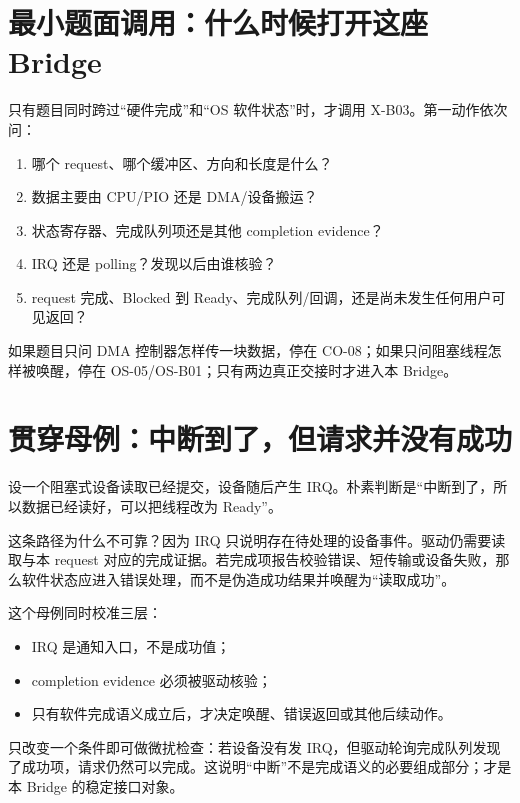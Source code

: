 \documentclass[UTF8,fontset=none,11pt,a4paper]{ctexart}
\begin{document}
\section{最小题面调用：什么时候打开这座 Bridge}

只有题目同时跨过“硬件完成”和“OS 软件状态”时，才调用 X-B03。第一动作依次问：

\begin{enumerate}
  \item {} 哪个 request、哪个缓冲区、方向和长度是什么？
  \item {} 数据主要由 CPU/PIO 还是 DMA/设备搬运？
  \item {} 状态寄存器、完成队列项还是其他 completion evidence？
  \item {} IRQ 还是 polling？发现以后由谁核验？
  \item {} request 完成、Blocked 到 Ready、完成队列/回调，还是尚未发生任何用户可见返回？
\end{enumerate}

如果题目只问 DMA 控制器怎样传一块数据，停在 CO-08；如果只问阻塞线程怎样被唤醒，停在 OS-05/OS-B01；只有两边真正交接时才进入本 Bridge。

\section{贯穿母例：中断到了，但请求并没有成功}

设一个阻塞式设备读取已经提交，设备随后产生 IRQ。朴素判断是“中断到了，所以数据已经读好，可以把线程改为 Ready”。

这条路径为什么不可靠？因为 IRQ 只说明存在待处理的设备事件。驱动仍需要读取与本 request 对应的完成证据。若完成项报告校验错误、短传输或设备失败，那么软件状态应进入错误处理，而不是伪造成功结果并唤醒为“读取成功”。

这个母例同时校准三层：

\begin{itemize}
  \item {}IRQ 是通知入口，不是成功值；
  \item {}completion evidence 必须被驱动核验；
  \item {}只有软件完成语义成立后，才决定唤醒、错误返回或其他后续动作。
\end{itemize}

只改变一个条件即可做微扰检查：若设备没有发 IRQ，但驱动轮询完成队列发现了成功项，请求仍然可以完成。这说明“中断”不是完成语义的必要组成部分；才是本 Bridge 的稳定接口对象。
\end{document}

